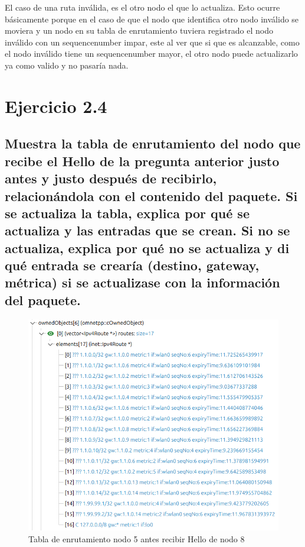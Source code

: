 El caso de una ruta inválida, es el otro nodo el que lo actualiza. Esto ocurre básicamente porque en el caso de que el nodo que identifica otro nodo inválido se moviera y un nodo en su tabla de enrutamiento tuviera registrado el nodo inválido con un sequencenumber impar, este al ver que si que es alcanzable, como el nodo inválido tiene un sequencenumber mayor, el otro nodo puede actualizarlo ya como valido y no pasaría nada.

\section{Ejercicio 2.4}

\subsection{Muestra la tabla de enrutamiento del nodo que recibe el Hello de la pregunta anterior justo antes y justo
después de recibirlo, relacionándola con el contenido del paquete. Si se actualiza la tabla, explica por qué se
actualiza y las entradas que se crean. Si no se actualiza, explica por qué no se actualiza y di qué entrada se
crearía (destino, gateway, métrica) si se actualizase con la información del paquete.}

\begin{figure}[H]
    \centering
    \includegraphics[width=115mm, scale=0.75]{imaxes/dsdv/ejercicio2_4_nodo5.png}
    \caption{Tabla de enrutamiento nodo 5 antes recibir Hello de nodo 8}
    \label{fig:ejer2_4_1}
\end{figure}

